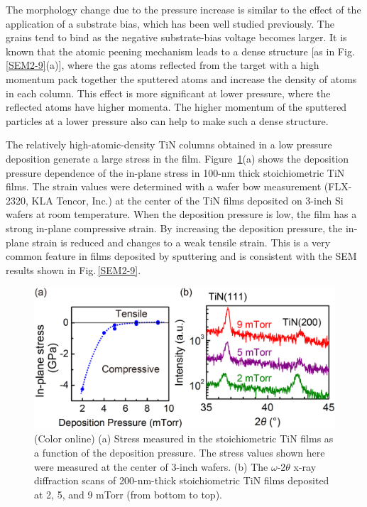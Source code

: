 The morphology change due to the pressure increase is similar to the effect of the application of a substrate bias, which has been well studied previously.\cite{Kumar1988} The grains tend to bind as the negative substrate-bias voltage becomes larger. It is known that the atomic peening mechanism leads to a dense structure [as in Fig.\,\ref{SEM2-9}(a)], where the gas atoms reflected from the target with a high momentum pack together the sputtered atoms and increase the density of atoms in each column.\cite{Thornton1985} This effect is more significant at lower pressure, where the reflected atoms have higher momenta. The higher momentum of the sputtered particles at a lower pressure also can help to make such a dense structure.

The relatively high-atomic-density TiN columns obtained in a low pressure deposition generate a large stress in the film. Figure \,\ref{Stress-XRD}(a) shows the deposition pressure dependence of the in-plane stress in 100-nm thick stoichiometric TiN films. The strain values were determined with a wafer bow measurement (FLX-2320, KLA Tencor, Inc.) at the center of the TiN films deposited on 3-inch Si wafers  at room temperature. When the deposition pressure is low, the film has a strong in-plane compressive strain. By increasing the deposition pressure, the in-plane strain is reduced and changes to a weak tensile strain. This is a very common feature in films deposited by sputtering and is consistent with the SEM results shown in Fig.\,\ref{SEM2-9}.

\begin{figure}
\begin{center}
\includegraphics[width=125mm]{Stress-XRD.jpg}
\end{center}
\caption{(Color online) (a) Stress measured in the stoichiometric TiN films as a function of the deposition pressure. The stress values shown here were measured at the center of 3-inch wafers. (b) The $\omega$-2$\theta$ x-ray diffraction scans of 200-nm-thick stoichiometric TiN films deposited at 2, 5, and 9 mTorr (from bottom to top).}
\label{Stress-XRD}
\end{figure}

